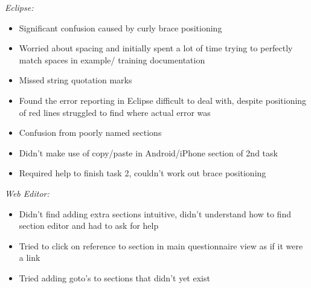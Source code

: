 \documentclass{report}
\begin{document}
\emph{Eclipse:}
\begin{itemize}
\item Significant confusion caused by curly brace positioning
\item Worried about spacing and initially spent a lot of time trying to perfectly match spaces in example/ training documentation
\item Missed string quotation marks
\item Found the error reporting in Eclipse difficult to deal with, despite positioning of red lines struggled to find where actual error was
\item Confusion from poorly named sections
\item Didn't make use of copy/paste in Android/iPhone section of 2nd task
\item Required help to finish task 2, couldn't work out brace positioning
\end{itemize}
\emph{Web Editor:}
\begin{itemize}
\item Didn't find adding extra sections intuitive, didn't understand how to find section editor and had to ask for help
\item Tried to click on reference to section in main questionnaire view as if it were a link
\item Tried adding goto's to sections that didn't yet exist
\end{itemize}
\end{document}
